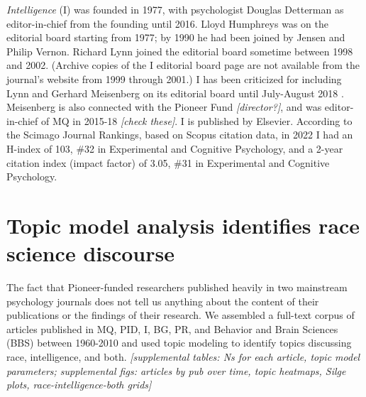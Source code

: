 \documentclass[12pt]{article}
\begin{document}
\emph{Intelligence} (I) was founded in 1977, with psychologist Douglas Detterman as editor-in-chief from the founding until 2016. Lloyd Humphreys was on the editorial board starting from 1977; by 1990 he had been joined by Jensen and Philip Vernon. Richard Lynn joined the editorial board sometime between 1998 and 2002. (Archive copies of the I editorial board page are not available from the journal's website from 1999 through 2001.) I has been criticized for including Lynn and Gerhard Meisenberg on its editorial board until July-August 2018 \cite{SainiSuperiorReturnRace2019}. Meisenberg is also connected with the Pioneer Fund \emph{{[}director?{]}}, and was editor-in-chief of MQ in 2015-18 \emph{{[}check these{]}}. I is published by Elsevier. According to the Scimago Journal Rankings, based on Scopus citation data, in 2022 I had an H-index of 103, \#32 in Experimental and Cognitive Psychology, and a 2-year citation index (impact factor) of 3.05, \#31 in Experimental and Cognitive Psychology.

\hypertarget{topic-model-analysis-identifies-race-science-discourse}{%
\section*{Topic model analysis identifies race science discourse}\label{topic-model-analysis-identifies-race-science-discourse}}

The fact that Pioneer-funded researchers published heavily in two mainstream psychology journals does not tell us anything about the content of their publications or the findings of their research. We assembled a full-text corpus of articles published in MQ, PID, I, BG, PR, and Behavior and Brain Sciences (BBS) between 1960-2010 and used topic modeling to identify topics discussing race, intelligence, and both. \emph{{[}supplemental tables: Ns for each article, topic model parameters; supplemental figs: articles by pub over time, topic heatmaps, Silge plots, race-intelligence-both grids{]}}
\end{document}

